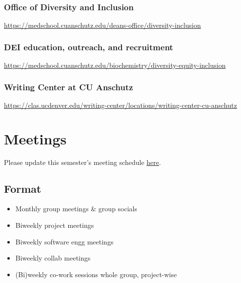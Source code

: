 \documentclass[
  letterpaper,
  DIV=11,
  numbers=noendperiod]{scrreprt}
\begin{document}
\hypertarget{office-of-diversity-and-inclusion}{%
\subsection{Office of Diversity and
Inclusion}\label{office-of-diversity-and-inclusion}}

\url{https://medschool.cuanschutz.edu/deans-office/diversity-inclusion}

\hypertarget{dei-education-outreach-and-recruitment}{%
\subsection{DEI education, outreach, and
recruitment}\label{dei-education-outreach-and-recruitment}}

\url{https://medschool.cuanschutz.edu/biochemistry/diversity-equity-inclusion}

\hypertarget{writing-center-at-cu-anschutz}{%
\subsection{Writing Center at CU
Anschutz}\label{writing-center-at-cu-anschutz}}

\url{https://clas.ucdenver.edu/writing-center/locations/writing-center-cu-anschutz}


\hypertarget{meetings}{%
\chapter{Meetings}\label{meetings}}

Please update this semester's meeting schedule
\href{https://github.com/JRaviLab/group/tree/master/meetings}{here}.

\hypertarget{format}{%
\section{Format}\label{format}}

\begin{itemize}
\item
  Monthly group meetings \& group socials
\item
  Biweekly project meetings
\item
  Biweekly software engg meetings
\item
  Biweekly collab meetings
\item
  (Bi)weekly co-work sessions \textbar{} whole group, project-wise
\end{itemize}
\end{document}
